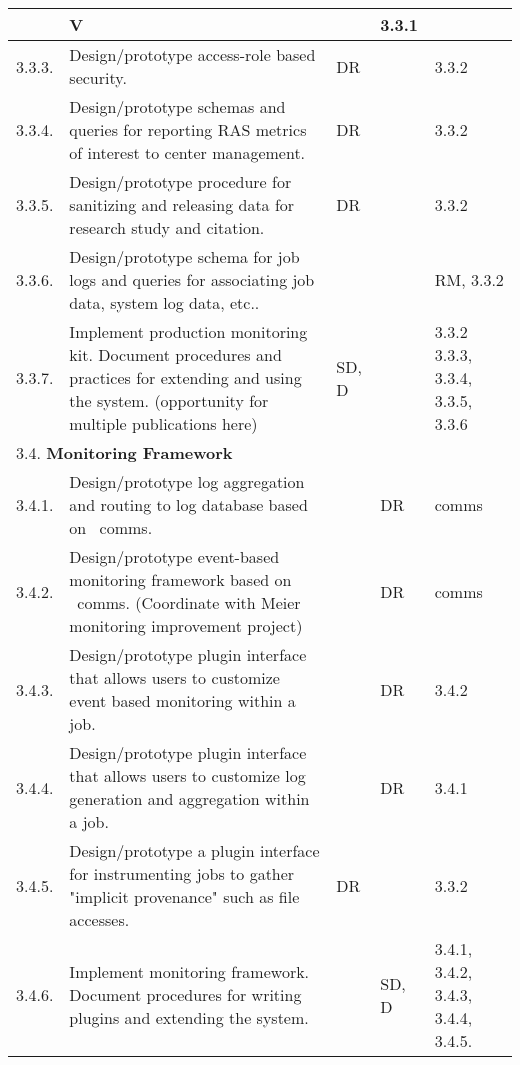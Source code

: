 \begin{longtable}{|p{1cm}|p{10.2cm}|p{1cm}|p{1cm}|p{1.8cm}|}
        & V
        & 
        & 3.3.1 \\
  \hline
  3.3.3.& Design/prototype access-role based security.
        & DR
        & 
        & 3.3.2 \\
  \hline
  3.3.4.& Design/prototype schemas and queries for reporting
          RAS metrics of interest to center management.
        & DR
        & 
        & 3.3.2 \\
  \hline
  3.3.5.& Design/prototype procedure for sanitizing and releasing data
	  for research study and citation.
        & DR
        & 
        & 3.3.2 \\
  \hline
  3.3.6.& Design/prototype schema for job logs and queries for
          associating job data, system log data, etc..
        & 
        & 
        & RM, 3.3.2 \\
  \hline
  3.3.7.& Implement production monitoring kit.
          Document procedures and practices for extending and using the system.
          (opportunity for multiple publications here) 
        & SD, D
        & 
        & 3.3.2 3.3.3, 3.3.4, 3.3.5, 3.3.6 \\
  \hline
  \multicolumn{5}{|l|}{3.4. \textbf{Monitoring Framework}} \\
  \hline
  3.4.1.& Design/prototype log aggregation and routing to log database
	  based on \ngrm\ comms.
        &
        & DR
        & comms \\
  \hline
  3.4.2.& Design/prototype event-based monitoring framework based on
	  \ngrm\ comms.  (Coordinate with Meier monitoring improvement project)
        &
        & DR
        & comms \\
  \hline
  3.4.3.& Design/prototype plugin interface that allows
          users to customize event based monitoring within a job.
        &
        & DR
        & 3.4.2 \\
  \hline
  3.4.4.& Design/prototype plugin interface that allows
          users to customize log generation and aggregation within a job.
        &
        & DR
        & 3.4.1 \\
  \hline
  3.4.5.& Design/prototype a plugin interface for instrumenting jobs
          to gather "implicit provenance" such as file accesses.
        & DR
        & 
        & 3.3.2 \\
  \hline
  3.4.6.& Implement monitoring framework.
          Document procedures for writing plugins and extending the system.
        &
        & SD, D
        & 3.4.1, 3.4.2, 3.4.3, 3.4.4, 3.4.5. \\
  \hline
\end{longtable}


